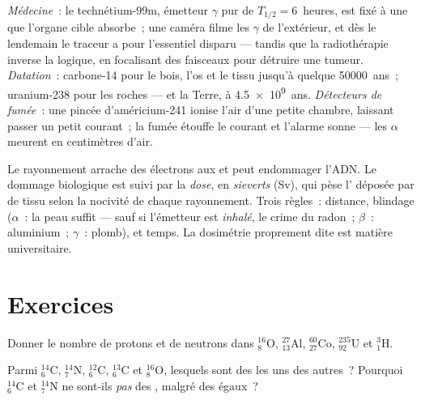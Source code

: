 \begin{example}\label{ex:g11:nucleus-radioactivity:uses}
\emph{Médecine}~: le technétium-99m, émetteur $\gamma$ pur de
$T_{1/2} = 6$~heures, est fixé à une
 que l'organe cible
absorbe~; une caméra filme les $\gamma$ de l'extérieur, et dès le
lendemain le traceur a pour l'essentiel disparu --- tandis que la
radiothérapie inverse la logique, en focalisant des faisceaux pour
détruire une tumeur. \emph{Datation}~: carbone-14 pour le bois, l'os
et le tissu jusqu'à quelque \num{50000}~ans~; uranium-238 pour les
roches --- et la Terre, à \num{4.5e9}~ans. \emph{Détecteurs de
fumée}~: une pincée d'américium-241 ionise l'air d'une petite chambre,
laissant passer un petit courant~; la fumée étouffe le courant et
l'alarme sonne --- les $\alpha$ meurent en centimètres d'air.
\end{example}

\begin{remark}\label{rem:g11:nucleus-radioactivity:dose}
Le rayonnement arrache des électrons aux
 et peut endommager
l'ADN. Le dommage biologique est suivi par la
\emph{dose}, en \emph{sieverts} (\unit{Sv}),
qui pèse l' déposée par
 de tissu selon la nocivité
de chaque rayonnement. Trois règles~: distance, blindage ($\alpha$~: la
peau suffit --- sauf si l'émetteur est \emph{inhalé}, le crime du
radon~; $\beta$~: aluminium~; $\gamma$~: plomb), et temps. La dosimétrie
proprement dite est matière universitaire.
\end{remark}

\section{Exercices}

\begin{exercise}[$\star$]\label{exo:g11:nucleus-radioactivity:1}
Donner le nombre de protons et de neutrons dans
${}^{16}_{8}\mathrm{O}$, ${}^{27}_{13}\mathrm{Al}$,
${}^{60}_{27}\mathrm{Co}$, ${}^{235}_{92}\mathrm{U}$ et
${}^{3}_{1}\mathrm{H}$.
\end{exercise}

\begin{exercise}[$\star$]\label{exo:g11:nucleus-radioactivity:2}
Parmi ${}^{14}_{6}\mathrm{C}$, ${}^{14}_{7}\mathrm{N}$,
${}^{12}_{6}\mathrm{C}$, ${}^{13}_{6}\mathrm{C}$ et
${}^{16}_{8}\mathrm{O}$, lesquels sont des
 les uns des autres~?
Pourquoi ${}^{14}_{6}\mathrm{C}$ et ${}^{14}_{7}\mathrm{N}$ ne sont-ils
\emph{pas} des , malgré des
 égaux~?
\end{exercise}

